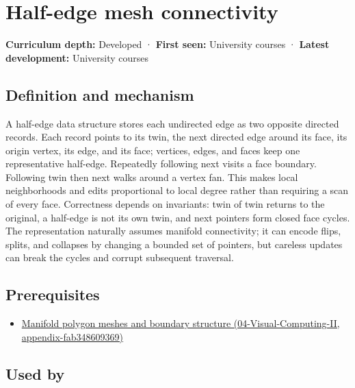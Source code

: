 \hypertarget{appendix-1aea26b2307f}{}
\section{Half-edge mesh connectivity}\label{appendix-1aea26b2307f-half-edge-mesh-connectivity}

\textbf{Curriculum depth:} Developed · \textbf{First seen:} University courses · \textbf{Latest development:} University courses

\subsection{Definition and mechanism}\label{appendix-1aea26b2307f-definition-and-mechanism}

A half-edge data structure stores each undirected edge as two opposite directed records. Each record points to its twin, the next directed edge around its face, its origin vertex, its edge, and its face; vertices, edges, and faces keep one representative half-edge. Repeatedly following next visits a face boundary. Following twin then next walks around a vertex fan. This makes local neighborhoods and edits proportional to local degree rather than requiring a scan of every face. Correctness depends on invariants: twin of twin returns to the original, a half-edge is not its own twin, and next pointers form closed face cycles. The representation naturally assumes manifold connectivity; it can encode flips, splits, and collapses by changing a bounded set of pointers, but careless updates can break the cycles and corrupt subsequent traversal.

\subsection{Prerequisites}\label{appendix-1aea26b2307f-prerequisites}

\begin{itemize}
\tightlist
\item
  \href{../04-Visual-Computing-II/main.pdf\#nameddest=appendix-fab348609369}{Manifold polygon meshes and boundary structure (04-Visual-Computing-II, appendix-fab348609369)}
\end{itemize}

\subsection{Used by}\label{appendix-1aea26b2307f-used-by}

